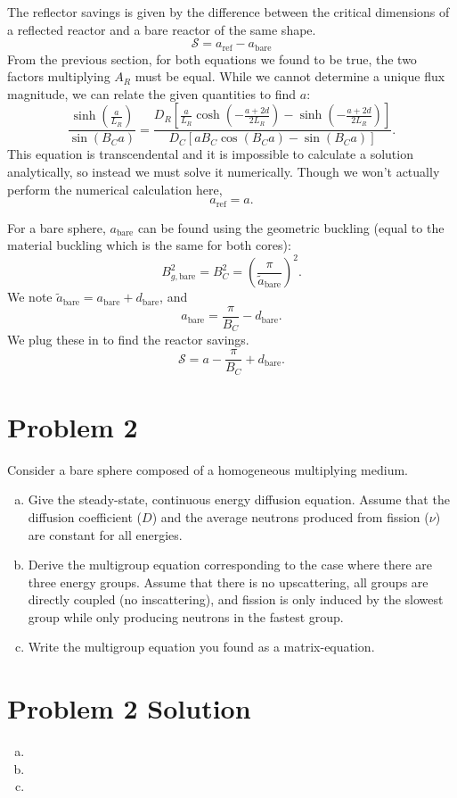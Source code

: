 \documentclass{report}
\begin{document}
\begin{enumerate}[a)]
The reflector savings is given by the difference between the critical dimensions of a reflected reactor and a bare reactor of the same shape.
$$ \mathcal{S} = a_{\text{ref}} - a_{\text{bare}} $$
From the previous section, for both equations we found to be true, the two factors multiplying $A_R$ must be equal. While we cannot determine a unique flux magnitude, we can relate the given quantities to find $a$:
$$ \frac{\sinh\left(\frac{a}{L_R}\right)}{\sin\left(B_C a\right)} = \frac{D_R \left[\frac{a}{L_R}\cosh\left(-\frac{a+2d}{2L_R}\right) - \sinh\left(-\frac{a+2d}{2L_R}\right)\right]}{D_C \left[a B_C \cos\left(B_C a\right) - \sin\left(B_C a\right)\right]}.$$
This equation is transcendental and it is impossible to calculate a solution analytically, so instead we must solve it numerically. Though we won't actually perform the numerical calculation here,
$$ a_{\text{ref}} = a .$$

For a bare sphere, $a_{\text{bare}}$ can be found using the geometric buckling (equal to the material buckling which is the same for both cores): 
$$ B_{g,\text{bare}}^2 = B_C^2 = \left(\frac{\pi}{\tilde{a}_{\text{bare}}}\right)^2 .$$
We note $\tilde{a}_{\text{bare}} = a_{\text{bare}} + d_{\text{bare}}$, and 
$$ a_{\text{bare}} = \frac{\pi}{B_C} - d_{\text{bare}} .$$
We plug these in to find the reactor savings.
$$\boxed{ \mathcal{S} = a - \frac{\pi}{B_C} + d_{\text{bare}} }.$$
\end{enumerate}


\newpage
\section*{Problem 2}

Consider a bare sphere composed of a homogeneous multiplying medium.
\begin{enumerate}[a)]
\item Give the steady-state, continuous energy diffusion equation. Assume that the diffusion coefficient ($D$) and the average neutrons produced from fission ($\nu$) are constant for all energies.
\item Derive the multigroup equation corresponding to the case where there are three energy groups. Assume that there is no upscattering, all groups are directly coupled (no inscattering), and fission is only induced by the slowest group while only producing neutrons in the fastest group.
\item Write the multigroup equation you found as a matrix-equation.
\end{enumerate}



\section*{Problem 2 Solution}

\begin{enumerate}[a)]

\item 
\item
\item

\end{enumerate}
\end{document}
